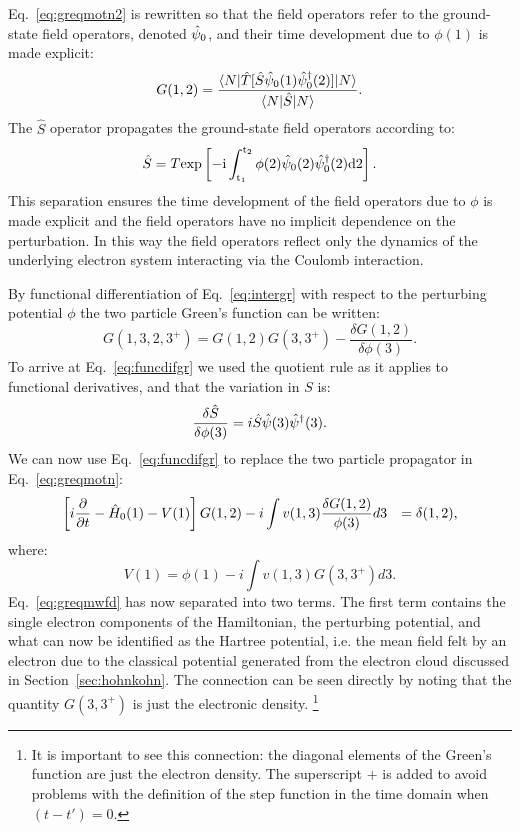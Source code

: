 Eq.~\ref{eq:greqmotn2} is rewritten so that the field operators refer to the ground-state field
operators, denoted $\hat{\psi}_{0}$, and their time development due to $\phi(1)$ is made explicit:
%
\begin{equation}
\label{eq:intergr}
G(1,2) =  \frac{\langle N|\hat{T}[\hat{S}\hat{\psi}_{0}(1)\hat{\psi}^{\dagger}_{0}(2)]|N\rangle}{\langle N| \hat{S} |N\rangle}.
\end{equation}
%
The $\hat{S}$ operator propagates the ground-state field operators according to:
%
\begin{equation}
\hat{S} = T\rm{exp}\left[-i\int_{t_{1}}^{t_{2}} \phi(2)\hat{\psi}_{0}(2)\hat{\psi}^{\dagger}_{0}(2)d{2}\right].
\end{equation}
%
This separation ensures the time development of the field operators due to $\phi$ is made explicit
and the field operators have no implicit dependence on the perturbation. In this way the field 
operators reflect only the dynamics of the underlying electron system interacting via the Coulomb interaction.

By functional differentiation of Eq.~\ref{eq:intergr} with respect to the perturbing potential $\phi$ 
the two particle Green's function can be written:
%
\begin{equation}
\label{eq:funcdifgr}
G(1,3,2,3^{+}) = G(1,2)G(3,3^{+}) - \frac{\delta G(1,2)}{\delta \phi(3)}.
\end{equation}
%
To arrive at Eq.~\ref{eq:funcdifgr} we used the quotient rule as it applies to functional derivatives, 
and that the variation in $S$ is:   
%
\begin{equation}
\frac{\delta \hat{S}}{\delta\phi(3)} = i \hat{S} \hat{\psi}(3)\hat{\psi}^{\dagger}(3).
\end{equation}
%
We can now use Eq.~\ref{eq:funcdifgr} to replace the two particle propagator in Eq.~\ref{eq:greqmotn}:
%
\begin{align}
\label{eq:greqmwfd}
\left[i\frac{\partial}{\partial t}-\hat{H}_{0}(1)-V(1)\right]G(1,2) &
	-i\int v(1,3)\frac{\delta G(1,2)}{\phi(3)}d3 &=\delta(1,2),
\end{align}
%
where: 
%
\begin{equation}
V(1) = \phi(1) - i\int v(1,3) G(3,3^{+})d3.
\end{equation}
%
Eq.~\ref{eq:greqmwfd} has now separated into two terms. The first term
contains the single electron components
of the Hamiltonian, the perturbing potential, and what can now be
identified as the Hartree potential, i.e. the mean field
felt by an electron due to the classical potential generated from the electron cloud 
discussed in Section~\ref{sec:hohnkohn}. The connection can be seen directly 
by noting that the quantity $G(3,3^{+})$ is just the electronic density. 
\footnote{It is important to see this connection: the diagonal elements 
of the Green's function are just the electron density. 
The superscript $+$ is added to avoid problems
with the definition of the step function in the time 
domain when $(t-t')=0$.}

